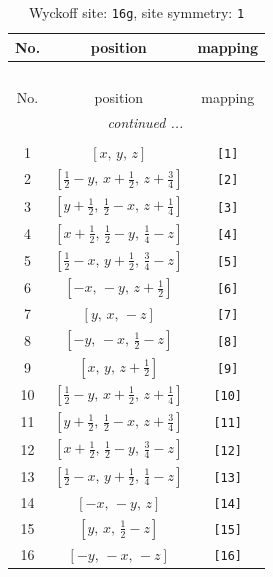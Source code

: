 \documentclass[fleqn,8pt]{jsarticle}
\begin{document}
\begin{longtable}{ccc}
\caption{Wyckoff site: {\tt 16g}, site symmetry: {\tt 1}}
 \\
 \hline \hline
No. & position & mapping \\ \hline \endfirsthead

\multicolumn{2}{l}{\tablename\ \thetable{}} \\
 \hline \hline
No. & position & mapping \\ \hline \endhead

 \hline \hline
\multicolumn{2}{r}{\footnotesize\it continued ...} \\ \endfoot

 \hline \hline
\multicolumn{2}{r}{} \\ \endlastfoot

1 & $\left[ x,\, y,\, z \right]$ & {\tt [1]} \\ \hline
2 & $\left[ \frac{1}{2} - y,\, x + \frac{1}{2},\, z + \frac{3}{4} \right]$ & {\tt [2]} \\ \hline
3 & $\left[ y + \frac{1}{2},\, \frac{1}{2} - x,\, z + \frac{1}{4} \right]$ & {\tt [3]} \\ \hline
4 & $\left[ x + \frac{1}{2},\, \frac{1}{2} - y,\, \frac{1}{4} - z \right]$ & {\tt [4]} \\ \hline
5 & $\left[ \frac{1}{2} - x,\, y + \frac{1}{2},\, \frac{3}{4} - z \right]$ & {\tt [5]} \\ \hline
6 & $\left[ - x,\, - y,\, z + \frac{1}{2} \right]$ & {\tt [6]} \\ \hline
7 & $\left[ y,\, x,\, - z \right]$ & {\tt [7]} \\ \hline
8 & $\left[ - y,\, - x,\, \frac{1}{2} - z \right]$ & {\tt [8]} \\ \hline
9 & $\left[ x,\, y,\, z + \frac{1}{2} \right]$ & {\tt [9]} \\ \hline
10 & $\left[ \frac{1}{2} - y,\, x + \frac{1}{2},\, z + \frac{1}{4} \right]$ & {\tt [10]} \\ \hline
11 & $\left[ y + \frac{1}{2},\, \frac{1}{2} - x,\, z + \frac{3}{4} \right]$ & {\tt [11]} \\ \hline
12 & $\left[ x + \frac{1}{2},\, \frac{1}{2} - y,\, \frac{3}{4} - z \right]$ & {\tt [12]} \\ \hline
13 & $\left[ \frac{1}{2} - x,\, y + \frac{1}{2},\, \frac{1}{4} - z \right]$ & {\tt [13]} \\ \hline
14 & $\left[ - x,\, - y,\, z \right]$ & {\tt [14]} \\ \hline
15 & $\left[ y,\, x,\, \frac{1}{2} - z \right]$ & {\tt [15]} \\ \hline
16 & $\left[ - y,\, - x,\, - z \right]$ & {\tt [16]} \\
\end{longtable}
\end{document}
